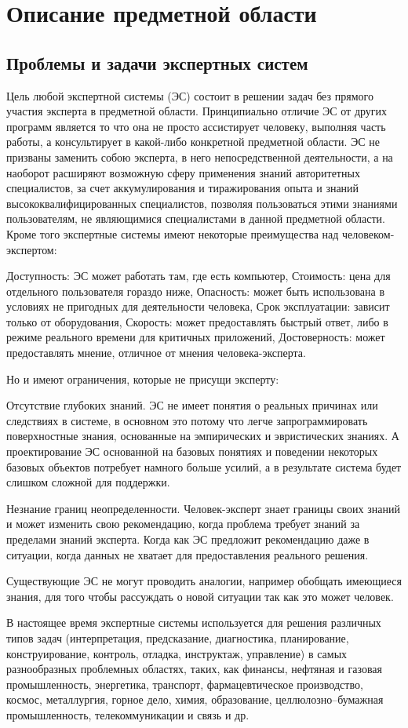 \chapter{Описание предметной области}
\section{Проблемы и задачи экспертных систем}

Цель любой экспертной системы (ЭС) состоит в решении задач без прямого участия эксперта в предметной области. Принципиально отличие ЭС от других программ является то что она не просто ассистирует человеку, выполняя часть работы, а консультирует в какой-либо конкретной предметной области. ЭС не призваны заменить собою эксперта, в него непосредственной деятельности, а на наоборот расширяют возможную сферу применения знаний авторитетных специалистов, за счет аккумулирования и тиражирования опыта и знаний высококвалифицированных специалистов, позволяя пользоваться этими знаниями пользователям, не являющимися специалистами в данной предметной области. Кроме того экспертные системы имеют некоторые преимущества над человеком-экспертом:
\begin{labelitemi}
	 Доступность: ЭС может работать там, где есть компьютер,
	 Стоимость: цена для отдельного пользователя гораздо ниже,
	 Опасность: может быть использована в условиях не пригодных для деятельности человека,
	 Срок эксплуатации: зависит только от оборудования,
	 Скорость: может предоставлять быстрый ответ, либо в режиме реального времени для критичных приложений,
	 Достоверность: может предоставлять мнение, отличное от мнения человека-эксперта.
\end{labelitemi}
Но и имеют ограничения, которые не присущи эксперту:

    Отсутствие глубоких знаний. ЭС не имеет понятия о реальных причинах или следствиях в системе, в основном это потому что легче запрограммировать поверхностные знания, основанные на эмпирических и эвристических знаниях. А проектирование ЭС основанной на базовых понятиях и поведении некоторых базовых объектов потребует намного больше усилий, а в результате система будет слишком сложной для поддержки.

    Незнание границ неопределенности. Человек-эксперт знает границы своих знаний и может изменить свою рекомендацию, когда проблема требует знаний за пределами знаний эксперта. Когда как ЭС предложит рекомендацию даже в ситуации, когда данных не хватает для предоставления реального решения.

    Существующие ЭС не могут проводить аналогии, например обобщать имеющиеся знания, для того чтобы рассуждать о новой ситуации так как это может человек.

В настоящее время экспертные системы используется для решения различных типов задач (интерпретация, предсказание, диагностика, планирование, конструирование, контроль, отладка, инструктаж, управление) в самых разнообразных проблемных областях, таких, как финансы,  нефтяная и газовая промышленность, энергетика, транспорт, фармацевтическое производство, космос, металлургия, горное дело, химия, образование, целлюлозно–бумажная промышленность, телекоммуникации и связь и др.